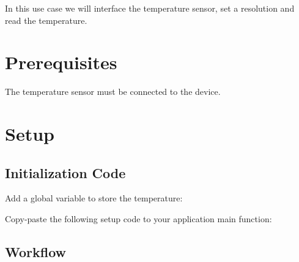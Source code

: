 In this use case we will interface the temperature sensor, set a resolution and read the temperature.\hypertarget{asfdoc_sam0_at30tse75x_qs_asfdoc_sam0_at30tse75x_qs_prereq}{}\section{Prerequisites}\label{asfdoc_sam0_at30tse75x_qs_asfdoc_sam0_at30tse75x_qs_prereq}
The temperature sensor must be connected to the device.\hypertarget{asfdoc_sam0_at30tse75x_qs_asfdoc_sam0_at30tse75x_qs_setup}{}\section{Setup}\label{asfdoc_sam0_at30tse75x_qs_asfdoc_sam0_at30tse75x_qs_setup}
\hypertarget{asfdoc_sam0_at30tse75x_qs_asfdoc_sam0_at30tse75x_qs_init_code}{}\subsection{Initialization Code}\label{asfdoc_sam0_at30tse75x_qs_asfdoc_sam0_at30tse75x_qs_init_code}
Add a global variable to store the temperature\+: 
\begin{DoxyCodeInclude}{0}
\end{DoxyCodeInclude}
Copy-\/paste the following setup code to your application main function\+: 
\begin{DoxyCodeInclude}{0}
\end{DoxyCodeInclude}
 \hypertarget{asfdoc_sam0_at30tse75x_qs_asfdoc_sam0_at30tse75x_qs_workflow}{}\subsection{Workflow}\label{asfdoc_sam0_at30tse75x_qs_asfdoc_sam0_at30tse75x_qs_workflow}


